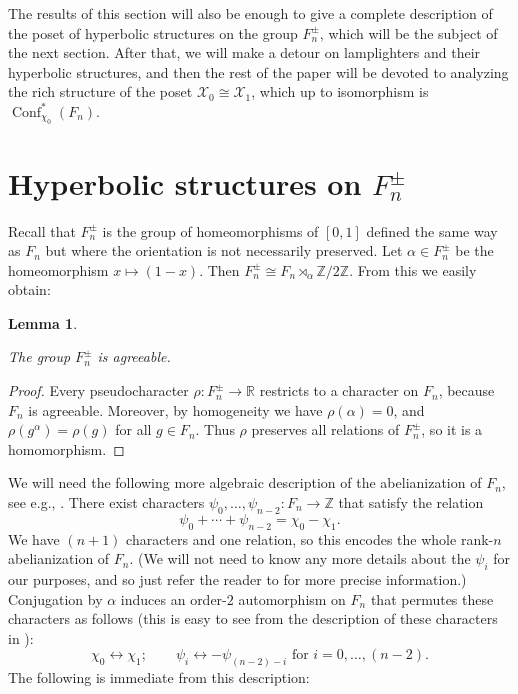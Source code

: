 \documentclass[reqno,12pt]{amsart}\setcounter{tocdepth}{1}
\newtheorem{lemma}[theorem]{Lemma}
\theoremstyle{definition}
\newcommand{\Z}{\mathbb{Z}}
\newcommand{\R}{\mathbb{R}}
\DeclareMathOperator{\Conf}{Conf}
\newcommand{\X}{\mathcal{X}}
\numberwithin{equation}{section}
\begin{document}
The results of this section will also be enough to give a complete description of the poset of hyperbolic structures on the group $F_n^\pm$, which will be the subject of the next section. After that, we will make a detour on lamplighters and their hyperbolic structures, and then the rest of the paper will be devoted to analyzing the rich structure of the poset $\X_0 \cong \X_1$, which up to isomorphism is $\Conf^\ast_{\chi_0}(F_n)$.



\section{Hyperbolic structures on $F_n^\pm$}\label{sec:reversing}

Recall that $F_n^\pm$ is the group of homeomorphisms of $[0, 1]$ defined the same way as $F_n$ but where the orientation is not necessarily preserved. Let $\alpha \in F_n^\pm$ be the homeomorphism $x \mapsto (1-x)$. Then $F_n^\pm \cong F_n \rtimes_{\alpha} \Z/2\Z$. From this we easily obtain:

\begin{lemma}
\label{lem:reversing:agreeable}

The group $F_n^\pm$ is agreeable.
\end{lemma}

\begin{proof}
Every pseudocharacter $\rho \colon F_n^{\pm} \to \R$ restricts to a character on $F_n$, because $F_n$ is agreeable. Moreover, by homogeneity we have $\rho(\alpha) = 0$, and $\rho(g^\alpha) = \rho(g)$ for all $g \in F_n$. Thus $\rho$ preserves all relations of $F_n^\pm$, so it is a homomorphism.
\end{proof}

We will need the following more algebraic description of the abelianization of $F_n$, see e.g., \cite{zaremsky17F_n}. There exist characters $\psi_0, \ldots, \psi_{n-2} \colon F_n \to \Z$ that satisfy the relation
\begin{equation}
\label{eq:relation}
\psi_0 + \cdots + \psi_{n-2} = \chi_0 - \chi_1.
\end{equation}
We have $(n+1)$ characters and one relation, so this encodes the whole rank-$n$ abelianization of $F_n$. (We will not need to know any more details about the $\psi_i$ for our purposes, and so just refer the reader to \cite{zaremsky17F_n} for more precise information.) Conjugation by $\alpha$ induces an order-$2$ automorphism on $F_n$ that permutes these characters as follows (this is easy to see from the description of these characters in \cite{zaremsky17F_n}):
\[
\chi_0 \longleftrightarrow \chi_1; \qquad \psi_i \longleftrightarrow -\psi_{(n-2)-i} \text{ for } i = 0, \ldots, (n-2).
\]
The following is immediate from this description:
\end{document}
